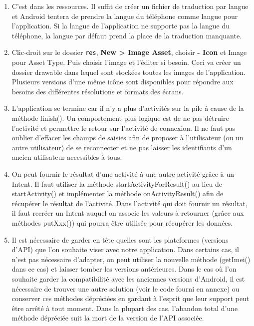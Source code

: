 \documentclass[a4paper]{article}
\begin{document}
\begin{enumerate}
	\item C'est dans les ressources. Il suffit de créer un fichier de traduction par langue et Android tentera de prendre la langue du téléphone comme langue pour l'application.
    Si la langue de l'application ne supporte pas la langue du téléphone, la langue par défaut prend la place de la traduction manquante.
	
    \item Clic-droit sur le dossier 
    \lstinline{res}, \textbf{New > Image Asset}, choisir \textbf{- Icon} et Image pour Asset Type. Puis choisir l'image et l'éditer si besoin. Ceci va créer un dossier drawable dans lequel sont stockées toutes les images de l'application. Plusieurs versions d'une même icône sont disponibles pour répondre aux besoins des différentes résolutions et formats des écrans.
    
    \item L'application se termine car il n'y a plus d'activités sur la pile à cause de la méthode finish(). Un comportement plus logique est de ne pas détruire l'activité et permettre le retour sur l'activité de connexion. Il ne faut pas oublier d'effacer les champs de saisies afin de proposer à l'utilisateur (ou un autre utilisateur) de se reconnecter et ne pas laisser les identifiants d'un ancien utilisateur accessibles à tous.
    
    \item On peut fournir le résultat d'une activité à une autre activité grâce à un Intent. Il faut utiliser la méthode startActivityForResult() au lieu de startActivity() et implémenter la méthode onActivityResult() afin de récupérer le résultat de l'activité. Dans l'activité qui doit fournir un résultat, il faut recréer un Intent auquel on associe les valeurs à retourner (grâce aux méthodes putXxx()) qui pourra être utilisée pour récupérer les données.
    
    \item Il est nécessaire de garder en tête quelles sont les plateformes (versions d'API) que l'on souhaite viser avec notre application. Dans certains cas, il n'est pas nécessaire d'adapter, on peut utiliser la nouvelle méthode (getImei() dans ce cas) et laisser tomber les versions antérieures. Dans le cas où l'on souhaite garder la compatibilité avec les anciennes versions d'Android, il est nécessaire de trouver une autre solution (voir le code fourni en annexe) ou conserver ces méthodes dépréciées en gardant à l'esprit que leur support peut être arrêté à tout moment. Dans la plupart des cas, l'abandon total d'une méthode dépréciée suit la mort de la version de l'API associée.
    

\end{enumerate}
\end{document}
